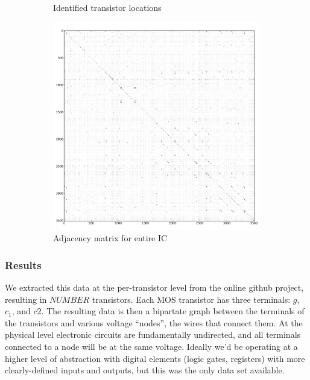 \documentclass{article}
\begin{document}
\begin{figure}
\begin{subfigure}[b]{0.50\textwidth}
    \caption{Identified transistor locations}
    \label{fig:mos6502:transistors}
  \end{subfigure}
  \begin{subfigure}[b]{0.7\textwidth}
    \includegraphics[width=\textwidth]{mos6502/all.adj.png}
    \caption{Adjacency matrix for entire IC}
    \label{fig:mos6502:adj}
  \end{subfigure}
  \caption{}
  \label{fig:mos6502:adjj}
\end{figure}

\subsubsection{Results}

We extracted this data at the per-transistor level from the online
github project, resulting in $NUMBER$ transistors. Each MOS transistor
has three terminals: $g$, $c_1$, and $c2$. The resulting data is then
a bipartate graph between the terminals of the transistors and various
voltage ``nodes'', the wires that connect them. At the physical level
electronic circuits are fundamentally undirected, and all terminals
connected to a node will be at the same voltage. Ideally we'd be
operating at a higher level of abstraction with digital elements (logic gates,
registers) with more clearly-defined inputs and outputs, but this
was the only data set available. 
\end{document}
